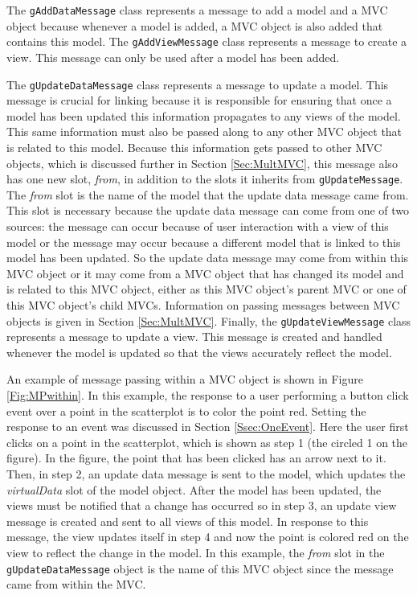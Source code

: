 \documentclass{article}[11pt]
\newcommand{\Robject}[1]{{\texttt{#1}}}
\newcommand{\Rslot}[1]{\textsl{#1}}
\begin{document}
The \Robject{gAddDataMessage} class represents a message to add a model and a
MVC object because whenever a model is added, a MVC object is also added that
contains this model.  The \Robject{gAddViewMessage} class represents a message
to create a view.  This message can only be used after a model has been
added.  

The \Robject{gUpdateDataMessage} class represents a message to update
a model.  This message is crucial for linking because it is responsible for
ensuring that once a model has been updated this information propagates to
any views of the model.  This same information must also be passed along to any
other MVC object that is related to this model.  Because this information gets
passed to other MVC objects, which is discussed further in Section
\ref{Sec:MultMVC}, this message also has one new slot, \Rslot{from}, in
addition to the slots it inherits from \Robject{gUpdateMessage}.  The
\Rslot{from} slot is the name of the model that the update data message came
from.  This slot is necessary because the update data message can come from
one of two sources: the message can occur because of user interaction with a
view of this model or the message may occur because a different model that is
linked to this model has been updated.  So the update data message may come
from within this MVC object or it may come from a MVC object that
has changed its model and is related to this MVC object, either as this MVC
object's parent MVC or one of this MVC object's child MVCs.  Information on
passing messages between MVC objects is given in Section \ref{Sec:MultMVC}.
Finally, the \Robject{gUpdateViewMessage} class represents a message to update
a view.  This message is created and handled whenever the model is updated so
that the views accurately reflect the model. 

An example of message passing within a MVC object is shown in Figure
\ref{Fig:MPwithin}.  In this example, the response to a user performing a
button click event over a point in the scatterplot is to color the point red.
Setting the response to an event was discussed in Section
\ref{Ssec:OneEvent}.  Here the user first clicks on a point in the
scatterplot, which is shown as step 1 (the circled 1 on the figure).  In the
figure, the point that has been clicked has an arrow next to it.  Then, in
step 2, an update data message is sent to the model, which updates the
\Rslot{virtualData} slot of the model object.  After the model has been
updated, the views must be notified that a change has occurred so in step 3,
an update view message is created and sent to all views of this model.  In
response to this message, the view updates itself in step 4 and now the point
is colored red on the view to reflect the change in the model.  In this
example, the \Rslot{from} slot in the \Robject{gUpdateDataMessage} object is
the name of this MVC object since the message came from within the MVC.
\end{document}
